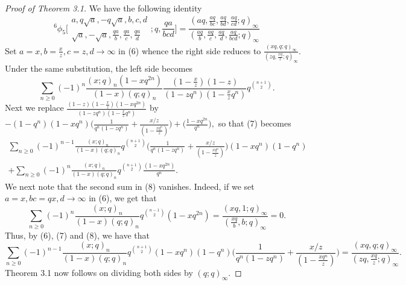 \documentclass[10pt,reqno]{amsart}
\begin{document}
\vspace{1cm}
\begin{proof}[Proof of Theorem 3.1]
We have the following identity
\begin{equation}
    ^6\phi_5\Bigg[\begin{array}{c}
             a, q\sqrt a,-q\sqrt a,b,c,d \\
             \sqrt a,-\sqrt a,\displaystyle\frac{qa}{b},\displaystyle\frac{qa}{c},\displaystyle\frac{qa}{d}
    \end{array}
;q,\displaystyle\frac{qa}{bcd}\Bigg]=\displaystyle\frac{(aq,\displaystyle\frac{aq}{bc},\displaystyle\frac{aq}{bd},\displaystyle\frac{aq}{cd};q)_{\infty}}{(\displaystyle\frac{aq}{b},\displaystyle\frac{aq}{c},\displaystyle\frac{aq}{d},\displaystyle\frac{aq}{bcd};q)_{\infty}}
\end{equation}
Set $a=x,b=\displaystyle\frac{x}{z},c=z,d\rightarrow\infty$ in (6) whence the right side reduces to $\displaystyle\frac{(xq,q;q)_{\infty}}{(zq,\displaystyle\frac{xq}{z};q)_{\infty}}.$ Under the same substitution, the left side becomes
\begin{equation}
\displaystyle\sum_{n\geq 0}(-1)^n\displaystyle\frac{(x;q)_n(1-xq^{2n})}{(1-x)(q;q)_n}\displaystyle\frac{(1-\displaystyle\frac{x}{z})(1-z)}{(1-zq^n)(1-\displaystyle\frac{x}{z}q^n)}q^{\binom{n+1}{2}}.
\end{equation}
Next we replace $\displaystyle\frac{(1-z)(1-\displaystyle\frac{x}{z})(1-xq^{2n})}{(1-zq^n)(1-\displaystyle\frac{x}{z}q^n)}$ by $-(1-q^n)(1-xq^n)\big(\displaystyle\frac{1}{q^n(1-zq^n)}+\displaystyle\frac{x/z}{(1-\displaystyle\frac{xq^n}{z})}\big)+\big(\displaystyle\frac{1-xq^{2n}}{q^n}\big),$
so that (7) becomes 
\begin{equation}
\begin{split}
    \displaystyle\sum_{n\geq 0}(-1)^{n-1}\displaystyle\frac{(x;q)_n}{(1-x)(q;q)_n}q^{\binom{n+1}{2}}\big(\displaystyle\frac{1}{q^n(1-zq^n)}+\displaystyle\frac{x/z}{(1-\displaystyle\frac{xq^n}{z})}\big)(1-xq^n)(1-q^n)\\
    +\displaystyle\sum_{n\geq 0}(-1)^{n}\displaystyle\frac{(x;q)_n}{(1-x)(q;q)_n}q^{\binom{n+1}{2}}\displaystyle\frac{(1-xq^{2n})}{q^n}.
\end{split}
\end{equation}
We next note that the second sum in (8) vanishes. Indeed, if we set $a=x, bc=qx, d\rightarrow\infty$ in (6), we get that 
\begin{equation*}
    \displaystyle\sum_{n\geq 0}(-1)^{n}\displaystyle\frac{(x;q)_n}{(1-x)(q;q)_n}q^{\binom{n-1}{2}}(1-xq^{2n})=\displaystyle\frac{(xq,1;q)_{\infty}}{(\displaystyle\frac{xq}{b},b;q)_{\infty}}=0.
\end{equation*}
Thus, by (6), (7) and (8), we have that
\begin{equation*}
    \displaystyle\sum_{n\geq 0}(-1)^{n-1}\displaystyle\frac{(x;q)_n}{(1-x)(q;q)_n}q^{\binom{n+1}{2}}(1-xq^n)(1-q^n)\big(\displaystyle\frac{1}{q^n(1-zq^n)}+\displaystyle\frac{x/z}{(1-\displaystyle\frac{xq^n}{z})}\big)=\displaystyle\frac{(xq,q;q)_{\infty}}{(zq,\displaystyle\frac{xq}{z};q)_{\infty}}.
\end{equation*}
Theorem 3.1 now follows on dividing both sides by $(q;q)_{\infty}.$
\end{proof}
\end{document}
